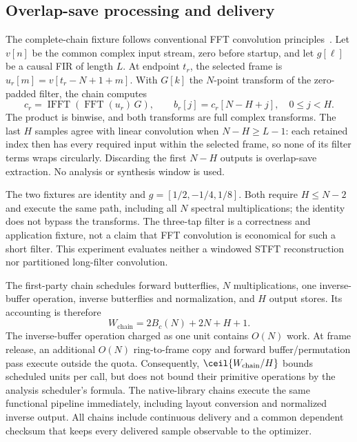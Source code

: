\subsection{Overlap-save processing and delivery}
The complete-chain fixture follows conventional FFT convolution
principles~\cite{wefers2015}. Let $v[n]$ be the common complex input stream,
zero before startup, and let $g[\ell]$ be a causal FIR of length $L$.
At endpoint $t_r$, the selected frame is
$u_r[m]=v[t_r-N+1+m]$. With $G[k]$ the $N$-point transform of the zero-padded
filter, the chain computes
\begin{equation}
 c_r=\operatorname{IFFT}\!\left(\operatorname{FFT}(u_r)\,G\right),
 \qquad b_r[j]=c_r[N-H+j],\quad 0\le j<H.
 \label{eq:chain-contract}
\end{equation}
The product is binwise, and both transforms are full complex transforms.
The last $H$ samples agree with linear convolution when $N-H\ge L-1$:
each retained index then has every required input within the selected frame,
so none of its filter terms wraps circularly. Discarding the first $N-H$
outputs is overlap-save extraction. No analysis or synthesis window is used.

The two fixtures are identity and
$g=[1/2,-1/4,1/8]$. Both require $H\le N-2$ and execute the same path,
including all $N$ spectral multiplications; the identity does not bypass the
transforms. The three-tap filter is a correctness and application fixture,
not a claim that FFT convolution is economical for such a short filter.
This experiment evaluates neither a windowed STFT reconstruction nor
partitioned long-filter convolution.

The first-party chain schedules forward butterflies, $N$ multiplications,
one inverse-buffer operation, inverse butterflies and normalization, and $H$
output stores. Its accounting is therefore
\begin{equation}
 W_{\mathrm{chain}}=2B_c(N)+2N+H+1.
 \label{eq:chain-work}
\end{equation}
The inverse-buffer operation charged as one unit contains $O(N)$ work.
At frame release, an additional $O(N)$ ring-to-frame copy and forward
buffer/permutation pass execute outside the quota. Consequently,
$\ceil{W_{\mathrm{chain}}/H}$ bounds scheduled units per call, but does not
bound their primitive operations by the analysis scheduler's formula.
The native-library chains execute the same functional pipeline immediately,
including layout conversion and normalized inverse output. All chains include
continuous delivery and a common dependent checksum that keeps every delivered
sample observable to the optimizer.

